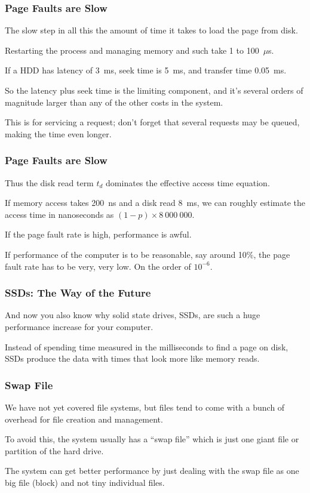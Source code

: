 \begin{frame}
\frametitle{Page Faults are Slow}

The slow step in all this the amount of time it takes to load the page from disk. 

Restarting the process and managing memory and such take 1 to 100~$\mu$s.

If a HDD has latency of 3~ms, seek time is 5~ms, and transfer time 0.05~ms. 

So the latency plus seek time is the limiting component, and it's several orders of magnitude larger than any of the other costs in the system. 

This is for servicing a request; don't forget that several requests may be queued, making the time even longer.

\end{frame}

\begin{frame}
\frametitle{Page Faults are Slow}

Thus the disk read term $t_{d}$ dominates the effective access time equation. 

If memory access takes 200~ns and a disk read 8~ms, we can roughly estimate the access time in nanoseconds as $(1-p) \times 8~000~000$. 

If the page fault rate is high, performance is awful. 

If performance of the computer is to be reasonable, say around 10\%, the page fault rate has to be very, very low. On the order of $10^{-6}$. 

\end{frame}

\begin{frame}
\frametitle{SSDs: The Way of the Future}

And now you also know why solid state drives, SSDs, are such a huge performance increase for your computer. 

Instead of spending time measured in the milliseconds to find a page on disk, SSDs produce the data with times that look more like memory reads.


\end{frame}

\begin{frame}
\frametitle{Swap File}

We have not yet covered file systems, but files tend to come with a bunch of overhead for file creation and management. 

To avoid this, the system usually has a ``swap file'' which is just one giant file or partition of the hard drive. 

The system can get better performance by just dealing with the swap file as one big file (block) and not tiny individual files.



\end{frame}

